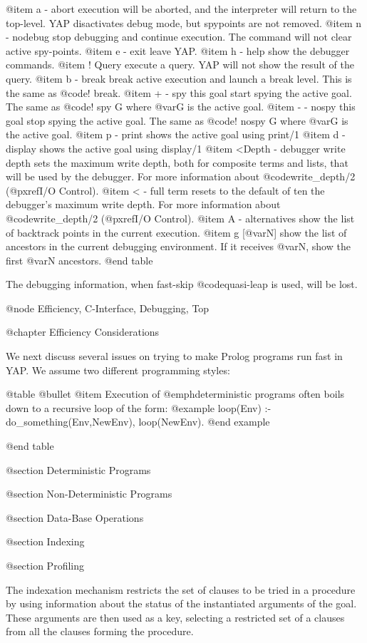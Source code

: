 {{{{{{{{{@item a - abort
execution will be aborted, and the interpreter will return to the
top-level. YAP disactivates debug mode, but spypoints are not removed.
@item n - nodebug
stop debugging and continue execution. The command will not clear active
spy-points.
@item e - exit
leave YAP.
@item h - help
show the debugger commands.
@item ! Query
execute a query. YAP will not show the result of the query.
@item b - break
break active execution and launch a break level. This is  the same as @code{!
break}.
@item + - spy this goal
start spying the active goal. The same as @code{! spy  G} where @var{G}
is the active goal.
@item - - nospy this goal
stop spying the active goal. The same as @code{! nospy G} where @var{G} is
the active goal.
@item p - print
shows the active goal using print/1
@item d - display
shows the active goal using display/1
@item <Depth - debugger write depth
sets the maximum write depth, both for composite terms and lists, that
will be used by the debugger. For more
information about @code{write_depth/2} (@pxref{I/O Control}).
@item < - full term
resets to the default of ten the debugger's maximum write depth. For
more information about @code{write_depth/2} (@pxref{I/O Control}).
@item A - alternatives
 show the list of backtrack points in the current execution. 
@item g [@var{N}] 
 show the list of ancestors in the current debugging environment. If it
 receives @var{N}, show the first @var{N} ancestors.
@end table

The debugging information, when fast-skip @code{quasi-leap} is used, will
be lost.

@node Efficiency, C-Interface, Debugging, Top

@chapter Efficiency Considerations

We next discuss several issues on trying to make Prolog programs run
fast in YAP. We assume two different programming styles:

@table @bullet
@item Execution of @emph{deterministic} programs often
boils down to a recursive loop of the form:
@example
loop(Env) :-
        do_something(Env,NewEnv),
        loop(NewEnv).
@end example

@end table

@section Deterministic Programs

@section Non-Deterministic Programs

@section Data-Base Operations

@section Indexing

@section Profiling

The indexation mechanism restricts the set of clauses to be tried in a
procedure by using information about the status of the instantiated
arguments of the goal.  These arguments are then used as a key,
selecting a restricted set of a clauses from all the clauses forming the
procedure.

}}}}}}}}}
